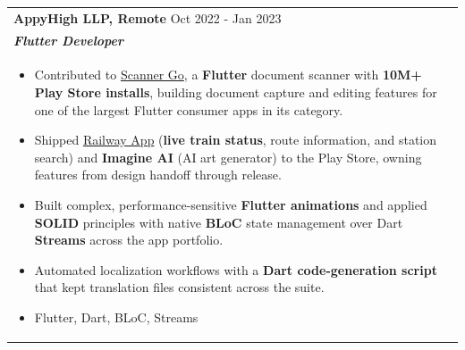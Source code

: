 \documentclass[a4paper,8pt]{article}
\begin{document}
\begin{tabularx}{\linewidth}{ @{}l r@{} }
\color[HTML]{1C033C} \textbf{AppyHigh LLP, Remote} \hfill \color[HTML]{371e77} Oct 2022 - Jan 2023 \\[4pt]
\color[HTML]{371e77}\textbf{\textit{Flutter Developer}}\ \hfill \color[HTML]{4B28A4} \\[5pt]
\begin{minipage}[t]{\linewidth}
    \begin{itemize}[nosep,after=\strut, leftmargin=2em, itemsep=2pt]
        \item Contributed to \href{https://play.google.com/store/apps/details?id=com.cam.scanner.camscanner.documentscanner}{Scanner Go}, a \textbf{Flutter} document scanner with \textbf{10M+ Play Store installs}, building document capture and editing features for one of the largest Flutter consumer apps in its category.
        \item Shipped \href{https://play.google.com/store/apps/details?id=railway.app.train.status}{Railway App} (\textbf{live train status}, route information, and station search) and \textbf{Imagine AI} (AI art generator) to the Play Store, owning features from design handoff through release.
        \item Built complex, performance-sensitive \textbf{Flutter animations} and applied \textbf{SOLID} principles with native \textbf{BLoC} state management over Dart \textbf{Streams} across the app portfolio.
        \item Automated localization workflows with a \textbf{Dart code-generation script} that kept translation files consistent across the suite.
        \item Flutter, Dart, BLoC, Streams
    \end{itemize}
    \end{minipage}
\end{tabularx}
\end{document}
